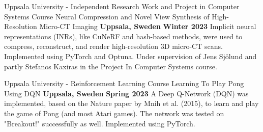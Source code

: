 

\begin{cventries}


        \cventry
        {Uppsala University - Independent Research Work and Project in Computer Systems Course} %
        {Neural Compression and Novel View Synthesis of High-Resolution Micro-CT Imaging} %
        {\textbf{Uppsala, Sweden}} %
        {\textbf{Winter 2023}} %
        {
            Implicit neural representations (INRs), like CuNeRF and hash-based methods, were used to compress, reconstruct, and render high-resolution 3D micro-CT scans. Implemented using PyTorch and Optuna. Under supervision of Jens Sjölund and partly Stefanos Kaxiras in the Project In Computer Systems course.
        }
        
       \cventry
        {Uppsala University - Reinforcement Learning Course} %
        {Learning To Play Pong Using DQN} %
        {\textbf{Uppsala, Sweden}} %
        {\textbf{Spring 2023}} %
        {
            A Deep Q-Network (DQN) was implemented, based on the Nature paper by Mnih et al. (2015), to learn and play the game of Pong (and most Atari games). The network was tested on "Breakout!" successfully as well. Implemented using PyTorch.
        }




\end{cventries}
